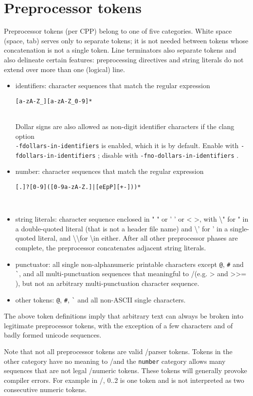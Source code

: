 \section{Preprocessor tokens}
Preprocessor tokens (per CPP) belong to one of five categories. White space (space, tab) serves only to separate tokens; it is not needed between tokens whose concatenation is not a single token. Line terminators also separate tokens and also delineate certain features: preprocessing directives and string literals do not extend over more than one (logical) line.
\begin{itemize}
	\item identifiers: character sequences that match the regular expression \\
\centerline{\texttt{[a-zA-Z\_][a-zA-Z\_0-9]*}} \\ 
Dollar signs are also allowed as non-digit identifier characters if the clang option\\ \texttt{-fdollars-in-identifiers} is enabled, which it is by default. 
Enable with \texttt{-fdollars-in-identifiers} ; disable with \texttt{-fno-dollars-in-identifiers} .
	\item number: character sequences that match the regular expression  \\
\centerline{\texttt{[.]?[0-9]([0-9a-zA-Z.]|[eEpP][+-]))*}}  \\

	\item string literals: character sequence enclosed in " " or ' ' or < >, with \textbackslash " for " in a double-quoted literal (that is not a header file name) and \textbackslash ' for ' in a single-quoted literal, and \textbackslash\textbackslash for \textbackslash in either. After all other preprocessor phases are complete, the preprocessor concatenates adjacent string literals.
	\item punctuator: all single non-alphanumeric printable characters except 
\verb|@|, \verb|#| and \verb|`|, and all multi-punctuation sequences that meaningful to \C/\cpp (e.g. > and >{>}= ), but not an arbitrary multi-punctuation character sequence.
	\item other tokens: \verb|@|, \verb|#|, \verb|`| and all non-ASCII single characters.
\end{itemize}
The above token definitions imply that arbitrary text can always be broken into
legitimate preprocessor tokens, with the exception of a few characters and of badly formed unicode sequences.


Note that not all preprocessor tokens are valid \C/\cpp parser tokens. Tokens in the other category have no meaning to \C/\cpp and the \texttt{number} category allows many sequences that are not legal \C/\cpp numeric tokens. These tokens will generally provoke compiler errors. For example in \C/\cpp, 0..2 is one token and is not interpreted as two consecutive numeric tokens.

